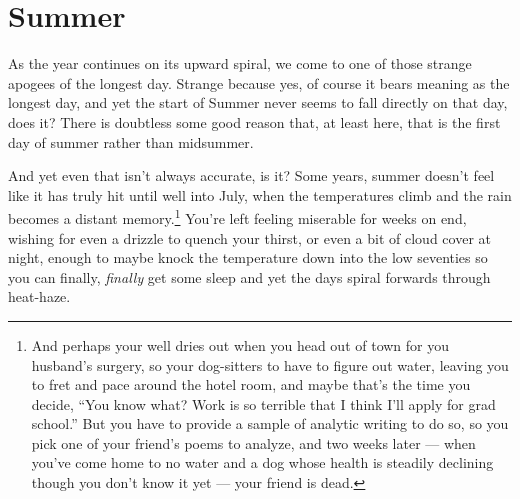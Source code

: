 \section*{Summer}

As the year continues on its upward spiral, we come to one of those strange apogees of the longest day. Strange because yes, of course it bears meaning as the longest day, and yet the start of Summer never seems to fall directly on that day, does it? There is doubtless some good reason that, at least here, that is the first day of summer rather than midsummer.

And yet even that isn't always accurate, is it? Some years, summer doesn't feel like it has truly hit until well into July, when the temperatures climb and the rain becomes a distant memory.\footnote{And perhaps your well dries out when you head out of town for you husband's surgery, so your dog-sitters to have to figure out water, leaving you to fret and pace around the hotel room, and maybe that's the time you decide, ``You know what? Work is so terrible that I think I'll apply for grad school.'' But you have to provide a sample of analytic writing to do so, so you pick one of your friend's poems to analyze, and two weeks later --- when you've come home to no water and a dog whose health is steadily declining though you don't know it yet --- your friend is dead.} You're left feeling miserable for weeks on end, wishing for even a drizzle to quench your thirst, or even a bit of cloud cover at night, enough to maybe knock the temperature down into the low seventies so you can finally, \emph{finally} get some sleep and yet the days spiral forwards through heat-haze.

